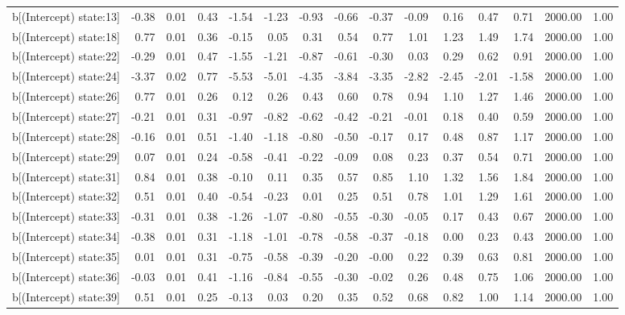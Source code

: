 \begin{table}[ht]
\begin{tabular}{rrrrrrrrrrrrrrr}
  b[(Intercept) state:13] & -0.38 & 0.01 & 0.43 & -1.54 & -1.23 & -0.93 & -0.66 & -0.37 & -0.09 & 0.16 & 0.47 & 0.71 & 2000.00 & 1.00 \\ 
  b[(Intercept) state:18] & 0.77 & 0.01 & 0.36 & -0.15 & 0.05 & 0.31 & 0.54 & 0.77 & 1.01 & 1.23 & 1.49 & 1.74 & 2000.00 & 1.00 \\ 
  b[(Intercept) state:22] & -0.29 & 0.01 & 0.47 & -1.55 & -1.21 & -0.87 & -0.61 & -0.30 & 0.03 & 0.29 & 0.62 & 0.91 & 2000.00 & 1.00 \\ 
  b[(Intercept) state:24] & -3.37 & 0.02 & 0.77 & -5.53 & -5.01 & -4.35 & -3.84 & -3.35 & -2.82 & -2.45 & -2.01 & -1.58 & 2000.00 & 1.00 \\ 
  b[(Intercept) state:26] & 0.77 & 0.01 & 0.26 & 0.12 & 0.26 & 0.43 & 0.60 & 0.78 & 0.94 & 1.10 & 1.27 & 1.46 & 2000.00 & 1.00 \\ 
  b[(Intercept) state:27] & -0.21 & 0.01 & 0.31 & -0.97 & -0.82 & -0.62 & -0.42 & -0.21 & -0.01 & 0.18 & 0.40 & 0.59 & 2000.00 & 1.00 \\ 
  b[(Intercept) state:28] & -0.16 & 0.01 & 0.51 & -1.40 & -1.18 & -0.80 & -0.50 & -0.17 & 0.17 & 0.48 & 0.87 & 1.17 & 2000.00 & 1.00 \\ 
  b[(Intercept) state:29] & 0.07 & 0.01 & 0.24 & -0.58 & -0.41 & -0.22 & -0.09 & 0.08 & 0.23 & 0.37 & 0.54 & 0.71 & 2000.00 & 1.00 \\ 
  b[(Intercept) state:31] & 0.84 & 0.01 & 0.38 & -0.10 & 0.11 & 0.35 & 0.57 & 0.85 & 1.10 & 1.32 & 1.56 & 1.84 & 2000.00 & 1.00 \\ 
  b[(Intercept) state:32] & 0.51 & 0.01 & 0.40 & -0.54 & -0.23 & 0.01 & 0.25 & 0.51 & 0.78 & 1.01 & 1.29 & 1.61 & 2000.00 & 1.00 \\ 
  b[(Intercept) state:33] & -0.31 & 0.01 & 0.38 & -1.26 & -1.07 & -0.80 & -0.55 & -0.30 & -0.05 & 0.17 & 0.43 & 0.67 & 2000.00 & 1.00 \\ 
  b[(Intercept) state:34] & -0.38 & 0.01 & 0.31 & -1.18 & -1.01 & -0.78 & -0.58 & -0.37 & -0.18 & 0.00 & 0.23 & 0.43 & 2000.00 & 1.00 \\ 
  b[(Intercept) state:35] & 0.01 & 0.01 & 0.31 & -0.75 & -0.58 & -0.39 & -0.20 & -0.00 & 0.22 & 0.39 & 0.63 & 0.81 & 2000.00 & 1.00 \\ 
  b[(Intercept) state:36] & -0.03 & 0.01 & 0.41 & -1.16 & -0.84 & -0.55 & -0.30 & -0.02 & 0.26 & 0.48 & 0.75 & 1.06 & 2000.00 & 1.00 \\ 
  b[(Intercept) state:39] & 0.51 & 0.01 & 0.25 & -0.13 & 0.03 & 0.20 & 0.35 & 0.52 & 0.68 & 0.82 & 1.00 & 1.14 & 2000.00 & 1.00 \\ 

\end{tabular}
\end{table}
